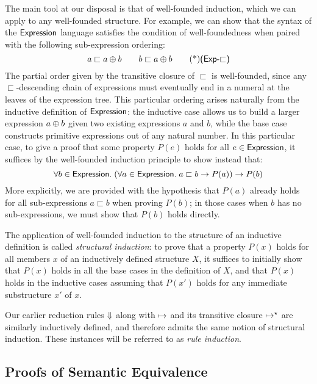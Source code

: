 \def\subExp{\sqsubset}

The main tool at our disposal is that of well-founded induction, which we
can apply to any well-founded structure. For example, we can show that the
syntax of the $\textsf{Expression}$ language satisfies the condition of
well-foundedness when paired with the following sub-expression ordering:
\[
	a \subExp a \Add b \qquad b \subExp a \Add b \eqTag{Exp-$\subExp$}
\]
The partial order given by the transitive closure of $\subExp$ is
well-founded, since any $\subExp$-descending chain of expressions must
eventually end in a numeral at the leaves of the expression tree. This
particular ordering arises naturally from the inductive definition of
$\textsf{Expression}$: the inductive case  allows us to build
a larger expression $a \oplus b$ given two existing expressions $a$ and $b$,
while the base case  constructs primitive
expressions out of any natural number. In this particular case, to give
a proof that some property $P(e)$ holds for all $e \in \textsf{Expression}$, it
suffices by the well-founded induction principle to show instead that:
\[
	\forall b \in \Expression.\;
		(\forall a \in \Expression.\; a \subExp b \rightarrow P(a))
		\rightarrow P(b)
\]
More explicitly, we are provided with the hypothesis that $P(a)$ already
holds for all sub-expressions $a \subExp b$ when proving $P(b)$; in those
cases when $b$ has no sub-expressions, we must show that $P(b)$ holds
directly.

The application of well-founded induction to the structure of an inductive
definition is called \emph{structural induction}: to prove that a property
$P(x)$ holds for all members $x$ of an inductively defined structure $X$, it
suffices to initially show that $P(x)$ holds in all the base cases in the
definition of $X$, and that $P(x)$ holds in the inductive cases assuming
that $P(x')$ holds for any immediate substructure $x'$ of $x$.

Our earlier reduction rules ${\Downarrow}$ along with ${\mapsto}$ and its
transitive closure ${\mapsto^\star}$ are similarly inductively defined, and
therefore admits the same notion of structural induction. These instances
will be referred to as \emph{rule induction}.


\subsection{Proofs of Semantic Equivalence}\label{sec:semantic-equivalence}%

